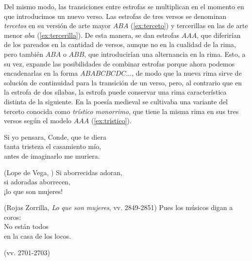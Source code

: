 Del mismo modo, las transiciones entre estrofas se multiplican en el momento en que introducimos un nuevo verso. Las estrofas de tres versos se denominan \textit{tercetos} en su versión de arte mayor $ABA$ (\ref{ex:terceto}) y tercerillas en las de arte menor $aba$ (\ref{ex:tercerilla}). De esta manera, se dan estrofas $AAA$, que diferirían de los pareados en la cantidad de versos, aunque no en la cualidad de la rima, pero también $ABA$ o $ABB$, que introducirían una alternancia en la rima. Esto, a su vez, expande las posibilidades de combinar estrofas porque ahora podemos encadenarlas en la forma $ABA BCB CDC ...$, de modo que la nueva rima sirve de solución de continuidad para la transición de un verso, pero, al contrario que en la estrofa de dos sílabas, la estrofa puede conservar una rima característica distinta de la siguiente. En la poesía medieval se cultivaba una variante del terceto conocida como \textit{trístico monorrimo}, que tiene la misma rima en sus tres versos según el modelo $AAA$ (\ref{ex:tristico}).
  
 \begin{exe}
 	\ex\label{ex:terceto}Si yo pensara, Conde, que te diera\\
 		tanta tristeza el casamiento mío,\\
 		antes de imaginarlo me muriera.\\
 		\strut\hfill(Lope de Vega, )
 	\ex\label{ex:tercerilla}Si aborrecidas adoran,\\
 	si adoradas aborrecen,\\                                              
 	¡lo que son mujeres!\\	
 	\strut\hfill(Rojas Zorrilla, \textit{Lo que son mujeres}, vv. 2849-2851\nocite{rojas_loquesonmujeres})
 	\ex\label{ex:tristico}Pues los músicos digan a coros:\\
 	No están todos\\
 	en la casa de los locos.\\	
 	\strut\hfill(vv. 2701-2703)
 	\end{exe}
 	
